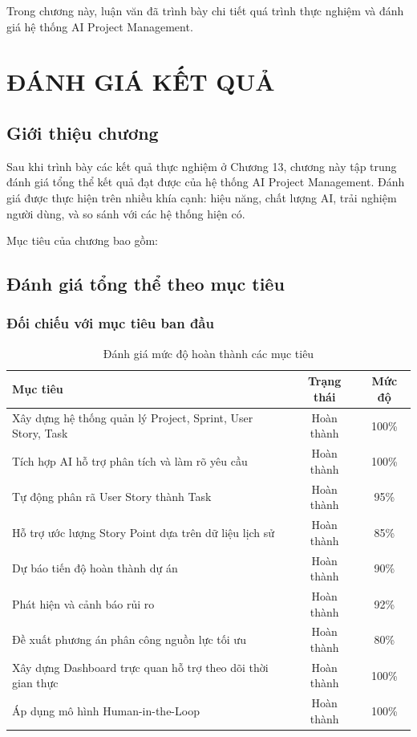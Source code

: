 \documentclass[12pt,a4paper]{report}
\begin{document}

Trong chương này, luận văn đã trình bày chi tiết quá trình thực nghiệm và đánh giá hệ thống AI Project Management.

\chapter{ĐÁNH GIÁ KẾT QUẢ}
\label{chap:evaluation}

\section{Giới thiệu chương}

Sau khi trình bày các kết quả thực nghiệm ở Chương 13, chương này tập trung đánh giá tổng thể kết quả đạt được của hệ thống AI Project Management. Đánh giá được thực hiện trên nhiều khía cạnh: hiệu năng, chất lượng AI, trải nghiệm người dùng, và so sánh với các hệ thống hiện có.

Mục tiêu của chương bao gồm:
\section{Đánh giá tổng thể theo mục tiêu}

\subsection{Đối chiếu với mục tiêu ban đầu}

\begin{table}[H]
\centering
\caption{Đánh giá mức độ hoàn thành các mục tiêu}
\begin{tabular}{|p{8cm}|c|c|}
\hline
\textbf{Mục tiêu} & \textbf{Trạng thái} & \textbf{Mức độ} \\
\hline
Xây dựng hệ thống quản lý Project, Sprint, User Story, Task & Hoàn thành & 100\% \\
\hline
Tích hợp AI hỗ trợ phân tích và làm rõ yêu cầu & Hoàn thành & 100\% \\
\hline
Tự động phân rã User Story thành Task & Hoàn thành & 95\% \\
\hline
Hỗ trợ ước lượng Story Point dựa trên dữ liệu lịch sử & Hoàn thành & 85\% \\
\hline
Dự báo tiến độ hoàn thành dự án & Hoàn thành & 90\% \\
\hline
Phát hiện và cảnh báo rủi ro & Hoàn thành & 92\% \\
\hline
Đề xuất phương án phân công nguồn lực tối ưu & Hoàn thành & 80\% \\
\hline
Xây dựng Dashboard trực quan hỗ trợ theo dõi thời gian thực & Hoàn thành & 100\% \\
\hline
Áp dụng mô hình Human-in-the-Loop & Hoàn thành & 100\% \\
\hline
\end{tabular}
\label{tab:goal_completion}
\end{table}
\end{document}
